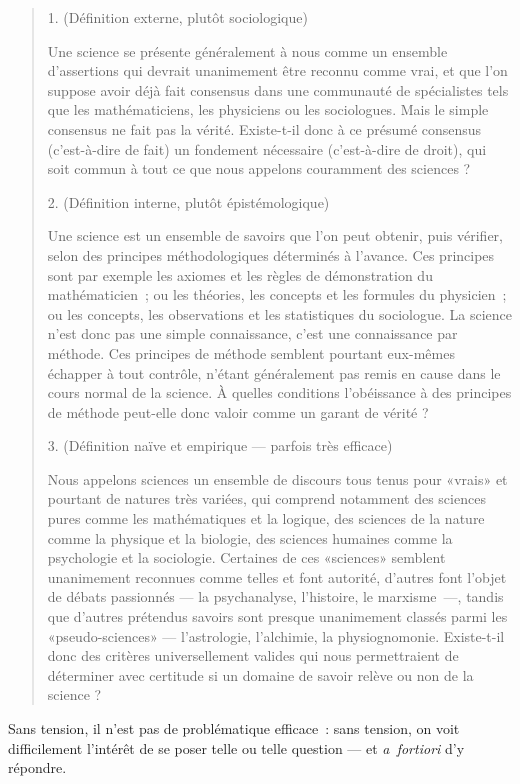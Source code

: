 \documentclass[a4paper,11pt]{article}
\begin{document}
\begin{quote}
  1. (Définition externe, plutôt sociologique)

Une science se présente généralement à nous comme un ensemble
d'assertions qui devrait unanimement être reconnu comme vrai, et que
l'on suppose avoir déjà fait consensus dans une communauté de
spécialistes tels que les mathématiciens, les physiciens ou les
sociologues. Mais le simple consensus ne fait pas la vérité. Existe-t-il
donc à ce présumé consensus (c'est-à-dire de fait) un fondement
nécessaire (c'est-à-dire de droit), qui soit commun à tout ce que nous
appelons couramment des sciences ?


2. (Définition interne, plutôt épistémologique)

Une science est un ensemble de savoirs que l'on peut obtenir, puis
vérifier, selon des principes méthodologiques déterminés à l'avance. Ces
principes sont par exemple les axiomes et les règles de démonstration du
mathématicien~; ou les théories, les concepts et les formules du
physicien~; ou les concepts, les observations et les statistiques du
sociologue. La science n'est donc pas une simple connaissance, c'est une
connaissance par méthode. Ces principes de méthode semblent pourtant
eux-mêmes échapper à tout contrôle, n'étant généralement pas remis en
cause dans le cours normal de la science. À quelles conditions
l'obéissance à des principes de méthode peut-elle donc valoir comme un
garant de vérité ?


3. (Définition naïve et empirique — parfois très efficace)

Nous appelons sciences un ensemble de discours tous tenus pour «vrais»
et pourtant de natures très variées, qui comprend notamment des sciences
pures comme les mathématiques et la logique, des sciences de la nature
comme la physique et la biologie, des sciences humaines comme la
psychologie et la sociologie. Certaines de ces «sciences» semblent
unanimement reconnues comme telles et font autorité, d'autres font
l'objet de débats passionnés — la psychanalyse, l'histoire, le
marxisme~—, tandis que d'autres prétendus savoirs sont presque
unanimement classés parmi les «pseudo-sciences» — l'astrologie,
l'alchimie, la physiognomonie. Existe-t-il donc des critères
universellement valides qui nous permettraient de déterminer avec
certitude si un domaine de savoir relève ou non de la science ?
\end{quote}

Sans tension, il n'est pas de problématique efficace~: sans tension, on
voit difficilement l'intérêt de se poser telle ou telle question --- et
\emph{a~fortiori} d'y répondre. 
\end{document}
